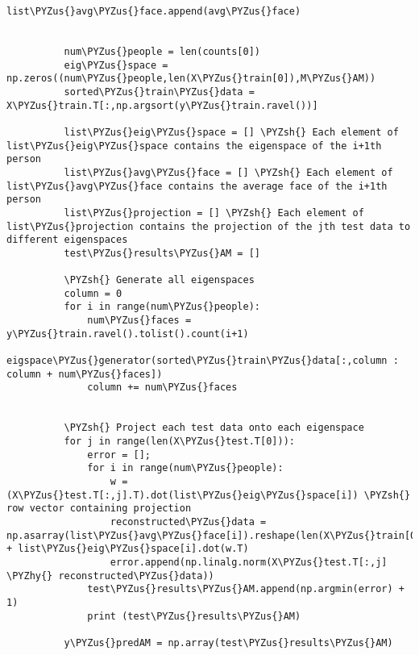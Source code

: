 \documentclass[11pt]{article}
\def\PYZus{\char`\_}
\def\PYZsh{\char`\#}
\def\PYZhy{\char`\-}
\begin{document}
\begin{Verbatim}[commandchars=\\\{\}]
              list\PYZus{}avg\PYZus{}face.append(avg\PYZus{}face)
          
          
          num\PYZus{}people = len(counts[0])
          eig\PYZus{}space = np.zeros((num\PYZus{}people,len(X\PYZus{}train[0]),M\PYZus{}AM))
          sorted\PYZus{}train\PYZus{}data = X\PYZus{}train.T[:,np.argsort(y\PYZus{}train.ravel())]
          
          list\PYZus{}eig\PYZus{}space = [] \PYZsh{} Each element of list\PYZus{}eig\PYZus{}space contains the eigenspace of the i+1th person
          list\PYZus{}avg\PYZus{}face = [] \PYZsh{} Each element of list\PYZus{}avg\PYZus{}face contains the average face of the i+1th person
          list\PYZus{}projection = [] \PYZsh{} Each element of list\PYZus{}projection contains the projection of the jth test data to different eigenspaces
          test\PYZus{}results\PYZus{}AM = []
          
          \PYZsh{} Generate all eigenspaces
          column = 0
          for i in range(num\PYZus{}people):
              num\PYZus{}faces = y\PYZus{}train.ravel().tolist().count(i+1)
              eigspace\PYZus{}generator(sorted\PYZus{}train\PYZus{}data[:,column : column + num\PYZus{}faces])
              column += num\PYZus{}faces
          
              
          \PYZsh{} Project each test data onto each eigenspace
          for j in range(len(X\PYZus{}test.T[0])): 
              error = [];
              for i in range(num\PYZus{}people): 
                  w = (X\PYZus{}test.T[:,j].T).dot(list\PYZus{}eig\PYZus{}space[i]) \PYZsh{} row vector containing projection
                  reconstructed\PYZus{}data = np.asarray(list\PYZus{}avg\PYZus{}face[i]).reshape(len(X\PYZus{}train[0]),1) + list\PYZus{}eig\PYZus{}space[i].dot(w.T) 
                  error.append(np.linalg.norm(X\PYZus{}test.T[:,j] \PYZhy{} reconstructed\PYZus{}data))
              test\PYZus{}results\PYZus{}AM.append(np.argmin(error) + 1)
              print (test\PYZus{}results\PYZus{}AM)
          
          y\PYZus{}predAM = np.array(test\PYZus{}results\PYZus{}AM)
\end{Verbatim}
\end{document}
